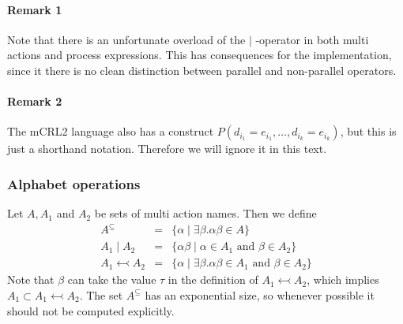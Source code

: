 \documentclass{article}
\begin{document}
\paragraph{Remark 1}

Note that there is an unfortunate overload of the $\boldsymbol{\mid }$%
-operator in both multi actions and process expressions. This has
consequences for the implementation, since it there is no clean distinction
between parallel and non-parallel operators.

\paragraph{Remark 2}

The mCRL2 language also has a construct $P(d_{i_{1}}=e_{i_{1}},\ldots
,d_{i_{k}}=e_{i_{k}})$, but this is just a shorthand notation. Therefore we
will ignore it in this text.

\subsubsection{Alphabet operations}

Let $A,A_{1}$ and $A_{2}$ be sets of multi action names. Then we define%
\[
\begin{array}{lll}
A^{\subseteq } & = & \{\alpha \mid \exists \beta .\alpha \beta \in A\} \\ 
A_{1}\mid A_{2} & = & \{\alpha \beta \mid \alpha \in A_{1}\text{ and }\beta
\in A_{2}\} \\ 
A_{1}\leftarrowtail A_{2} & = & \{\alpha \mid \exists \beta .\alpha \beta
\in A_{1}\text{ and }\beta \in A_{2}\}%
\end{array}%
\]%
Note that $\beta $ can take the value $\tau $ in the definition of $%
A_{1}\leftarrowtail A_{2}$, which implies $A_{1}\subset A_{1}\leftarrowtail
A_{2}$. The set $A^{\subseteq }$ has an exponential size, so whenever
possible it should not be computed explicitly.
\end{document}
